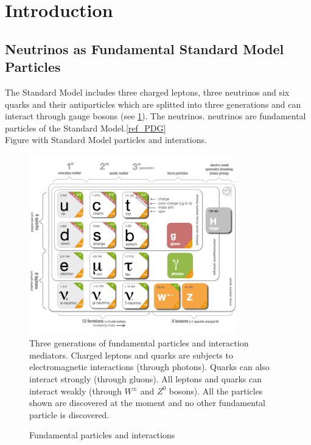 \section{Introduction}


\subsection{Neutrinos as Fundamental Standard Model Particles}
The Standard Model includes three charged leptons, three neutrinos and six quarks and their antiparticles which are splitted into three generations and can interact through gauge bosons (see \ref{fig:StandardModel}). The neutrinos. neutrinos are fundamental particles of the Standard Model.\ref{ref_PDG}\\
Figure with Standard Model particles and interations. \\

\begin{figure}
\caption{Fundamental particles and interactions}
\label{fig:StandardModel}
\centering
\includegraphics[width=0.8\textwidth, keepaspectratio=true]{figs/StandardModel.png}
\\Three generations of fundamental particles and interaction mediators. Charged leptons and quarks are subjects to electromagnetic interactions (through photons). Quarks can also interact strongly (through gluons). All leptons and quarks can interact weakly (through $W^{\pm}$ and $Z^0$ bosons). All the particles shown are discovered at the moment and no other fundamental particle is discovered. \cite{ref_fig_StandardModel}   
\end{figure}

